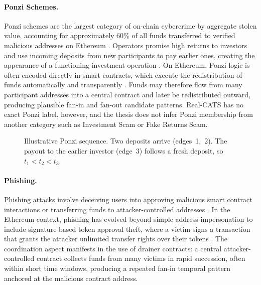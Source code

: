 \documentclass{thesisclass}
\begin{document}
\paragraph{Ponzi Schemes.}
Ponzi schemes are the largest category of on-chain cybercrime by aggregate stolen value, accounting for approximately 60\% of all funds transferred to verified malicious addresses on Ethereum \citep{hornuf2025cybercrime}. Operators promise high returns to investors and use incoming deposits from new participants to pay earlier ones, creating the appearance of a functioning investment operation \citep{bartoletti2020smart}. On Ethereum, Ponzi logic is often encoded directly in smart contracts, which execute the redistribution of funds automatically and transparently \citep{chen2020survey}. Funds may therefore flow from many participant addresses into a central contract and later be redistributed outward, producing plausible fan-in and fan-out candidate patterns. Real-CATS has no exact Ponzi label, however, and the thesis does not infer Ponzi membership from another category such as Investment Scam or Fake Returns Scam.

\begin{figure}[ht]
  \centering
  \caption[Ponzi candidate pattern]{Illustrative Ponzi sequence. Two deposits
    arrive (edges~1,~2). The payout to the earlier investor (edge~3) follows a fresh deposit,
    so $t_1 < t_2 < t_3$.}
  \label{fig:motif-ponzi}
\end{figure}

\paragraph{Phishing.}
Phishing attacks involve deceiving users into approving malicious smart contract interactions or transferring funds to attacker-controlled addresses \citep{chen2020phishing}. In the Ethereum context, phishing has evolved beyond simple address impersonation to include signature-based token approval theft, where a victim signs a transaction that grants the attacker unlimited transfer rights over their tokens \citep{hornuf2025cybercrime}. The coordination aspect manifests in the use of drainer contracts: a central attacker-controlled contract collects funds from many victims in rapid succession, often within short time windows, producing a repeated fan-in temporal pattern anchored at the malicious contract address.
\end{document}
